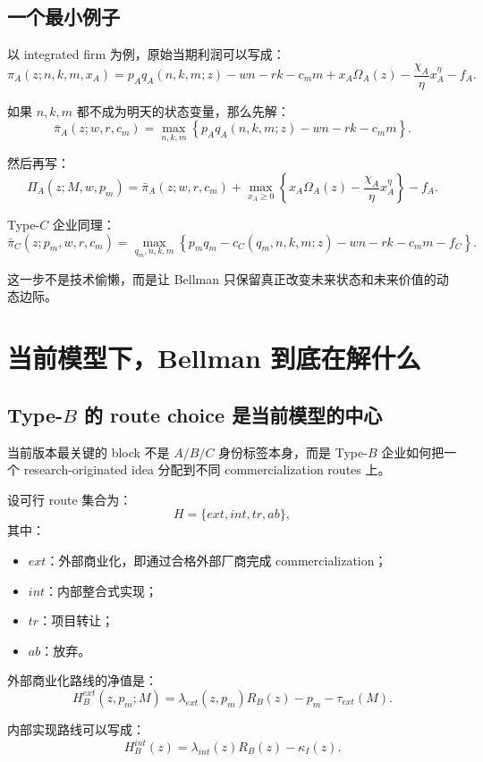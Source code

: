 \documentclass[12pt]{ctexart}
\begin{document}
\subsection{一个最小例子}

以 integrated firm 为例，原始当期利润可以写成：
\[
\pi_A(z;n,k,m,x_A)
=
p_A q_A(n,k,m;z)-wn-rk-c_m m
+x_A\Omega_A(z)-\frac{\chi_A}{\eta}x_A^{\eta}-f_A.
\]

如果 $n,k,m$ 都不成为明天的状态变量，那么先解：
\[
\bar\pi_A(z;w,r,c_m)
=
\max_{n,k,m}
\left\{
p_A q_A(n,k,m;z)-wn-rk-c_m m
\right\}.
\]

然后再写：
\[
\Pi_A(z;M,w,p_m)
=
\bar\pi_A(z;w,r,c_m)
+
\max_{x_A\ge 0}
\left\{
x_A\Omega_A(z)-\frac{\chi_A}{\eta}x_A^{\eta}
\right\}-f_A.
\]

Type-$C$ 企业同理：
\[
\bar\pi_C(z;p_m,w,r,c_m)
=
\max_{q_m,n,k,m}
\left\{
p_m q_m-c_C(q_m,n,k,m;z)-wn-rk-c_m m-f_C
\right\}.
\]

这一步不是技术偷懒，而是让 Bellman 只保留真正改变未来状态和未来价值的动态边际。

\section{当前模型下，Bellman 到底在解什么}

\subsection{Type-$B$ 的 route choice 是当前模型的中心}

当前版本最关键的 block 不是 $A/B/C$ 身份标签本身，而是 Type-$B$ 企业如何把一个 research-originated idea 分配到不同 commercialization routes 上。

设可行 route 集合为：
\[
H=\{ext,int,tr,ab\},
\]
其中：
\begin{itemize}
    \item $ext$：外部商业化，即通过合格外部厂商完成 commercialization；
    \item $int$：内部整合式实现；
    \item $tr$：项目转让；
    \item $ab$：放弃。
\end{itemize}

外部商业化路线的净值是：
\begin{equation}
H_B^{ext}(z,p_m;M)
=
\lambda_{ext}(z,p_m)R_B(z)-p_m-\tau_{ext}(M).
\label{eq:HBext_note}
\end{equation}

内部实现路线可以写成：
\begin{equation}
H_B^{int}(z)
=
\lambda_{int}(z)R_B(z)-\kappa_I(z).
\label{eq:HBint_note}
\end{equation}
\end{document}
